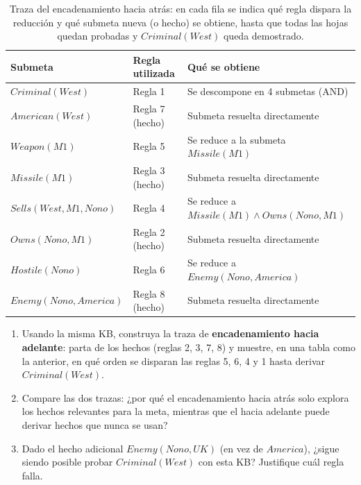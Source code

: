 \begin{table}[H]
    \centering
    \begin{tabular}{lll}
        \toprule
        Submeta & Regla utilizada & Qué se obtiene \\
        \midrule
        $Criminal(West)$          & Regla 1 & Se descompone en 4 submetas (AND) \\
        $American(West)$          & Regla 7 (hecho) & Submeta resuelta directamente \\
        $Weapon(M1)$              & Regla 5 & Se reduce a la submeta $Missile(M1)$ \\
        $Missile(M1)$             & Regla 3 (hecho) & Submeta resuelta directamente \\
        $Sells(West,M1,Nono)$     & Regla 4 & Se reduce a $Missile(M1) \land Owns(Nono,M1)$ \\
        $Owns(Nono,M1)$           & Regla 2 (hecho) & Submeta resuelta directamente \\
        $Hostile(Nono)$           & Regla 6 & Se reduce a $Enemy(Nono,America)$ \\
        $Enemy(Nono,America)$     & Regla 8 (hecho) & Submeta resuelta directamente \\
        \bottomrule
    \end{tabular}
    \caption{Traza del encadenamiento hacia atrás: en cada fila se indica qué regla dispara la reducción y qué
    submeta nueva (o hecho) se obtiene, hasta que todas las hojas quedan probadas y $Criminal(West)$ queda demostrado.}
\end{table}

\begin{exercise}
    \begin{enumerate}
        \item Usando la misma KB, construya la traza de \textbf{encadenamiento hacia adelante}: parta de los hechos
        (reglas 2, 3, 7, 8) y muestre, en una tabla como la anterior, en qué orden se disparan las reglas 5, 6, 4 y 1
        hasta derivar $Criminal(West)$.
        \item Compare las dos trazas: ¿por qué el encadenamiento hacia atrás solo explora los hechos relevantes para
        la meta, mientras que el hacia adelante puede derivar hechos que nunca se usan?
        \item Dado el hecho adicional $Enemy(Nono, UK)$ (en vez de $America$), ¿sigue siendo posible probar
        $Criminal(West)$ con esta KB? Justifique cuál regla falla.
    \end{enumerate}
\end{exercise}

